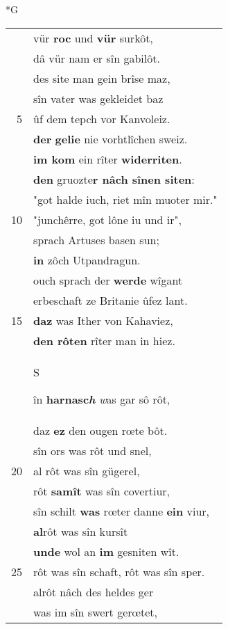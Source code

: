 \documentclass[8pt,a4paper,notitlepage]{article}
\begin{document}
\newpage
\begin{table}[ht]
\begin{minipage}[t]{0.5\linewidth}
\small
\begin{center}*G
\end{center}
\begin{tabular}{rl}
 & vür \textbf{roc} und \textbf{vür} surkôt,\\ 
 & dâ vür nam er sîn gabilôt.\\ 
 & des site man gein brîse maz,\\ 
 & sîn vater was gekleidet baz\\ 
5 & ûf dem tepch vor Kanvoleiz.\\ 
 & \textbf{der} \textbf{gelie} nie vorhtlîchen sweiz.\\ 
 & \textbf{im kom} ein rîter \textbf{widerriten}.\\ 
 & \textbf{den} gruozte\textbf{r nâch sînen siten}:\\ 
 & "got halde iuch, riet mîn muoter mir."\\ 
10 & "junchêrre, got lône iu und ir",\\ 
 & sprach Artuses basen sun;\\ 
 & \textbf{in} zôch Utpandragun.\\ 
 & ouch sprach der \textbf{werde} wîgant\\ 
 & erbeschaft ze Britanie ûfez lant.\\ 
15 & \textbf{daz} was Ither von Kahaviez,\\ 
 & \textbf{den rôten} rîter man in hiez.\\ 
 & \begin{large}S\end{large}în \textbf{harnasc\textit{h}} \textit{w}as gar sô rôt,\\ 
 & daz \textbf{ez} den ougen rœte bôt.\\ 
 & sîn ors was rôt und snel,\\ 
20 & al rôt was sîn gügerel,\\ 
 & rôt \textbf{samît} was sîn covertiur,\\ 
 & sîn schilt \textbf{was} rœter danne \textbf{ein} viur,\\ 
 & \textbf{al}rôt was sîn kursît\\ 
 & \textbf{unde} wol an \textbf{im} gesniten wît.\\ 
25 & rôt was sîn schaft, rôt was sîn sper.\\ 
 & alrôt nâch des heldes ger\\ 
 & was im sîn swert gerœtet,\\ 

\end{tabular}
\end{minipage}
\end{table}
\end{document}
